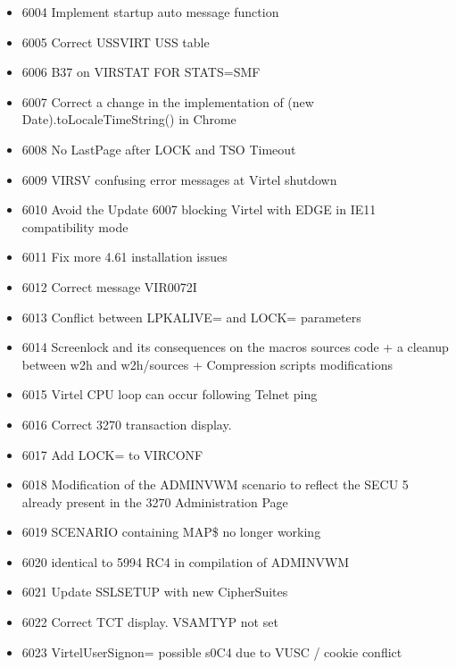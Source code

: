 \documentclass[letterpaper,10pt,english]{sphinxmanual}
\begin{document}
\begin{itemize}
\item {} 
6004 Implement startup auto message function

\item {} 
6005 Correct USSVIRT USS table

\item {} 
6006 B37 on VIRSTAT  FOR STATS=SMF

\item {} 
6007 Correct a change in the implementation of (new Date).toLocaleTimeString() in Chrome

\item {} 
6008 No LastPage after LOCK and TSO Timeout

\item {} 
6009 VIRSV confusing error messages at Virtel shutdown

\item {} 
6010 Avoid the Update 6007 blocking Virtel with EDGE in IE11 compatibility mode

\item {} 
6011 Fix more 4.61 installation issues

\item {} 
6012 Correct message VIR0072I

\item {} 
6013 Conflict between LPKALIVE= and LOCK= parameters

\item {} 
6014 Screenlock and its consequences on the macros sources code + a cleanup between w2h and w2h/sources + Compression scripts modifications

\item {} 
6015 Virtel CPU loop can occur following Telnet ping

\item {} 
6016 Correct 3270 transaction display.

\item {} 
6017 Add LOCK= to VIRCONF

\item {} 
6018 Modification of the ADMINVWM scenario to reflect the SECU 5 already present in the 3270 Administration Page

\item {} 
6019 SCENARIO containing MAP\$ no longer working

\item {} 
6020 identical to 5994 RC4 in compilation of ADMINVWM

\item {} 
6021 Update SSLSETUP with new CipherSuites

\item {} 
6022 Correct TCT display. VSAMTYP not set

\item {} 
6023 VirtelUserSignon= possible s0C4 due to VUSC / cookie conflict

\end{itemize}



\renewcommand{\indexname}{Index}
\printindex
\end{document}
